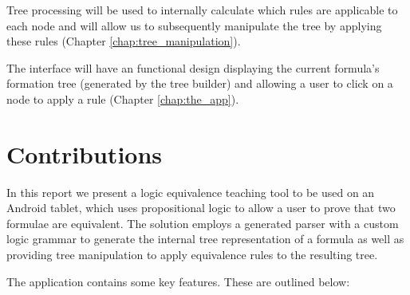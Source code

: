 \documentclass{report}
\begin{document}
Tree processing will be used to internally calculate which rules are applicable to each node and will allow us to subsequently manipulate the tree by applying these rules (Chapter \ref{chap:tree_manipulation}).

The interface will have an functional design displaying the current formula's formation tree (generated by the tree builder) and allowing a user to click on a node to apply a rule (Chapter \ref{chap:the_app}).

\section{Contributions}
\label{sec:objectives}

In this report we present a logic equivalence teaching tool to be used on an Android tablet, which uses propositional logic to allow a user to prove that two formulae are equivalent. The solution employs a generated parser with a custom logic grammar to generate the internal tree representation of a formula as well as providing tree manipulation to apply equivalence rules to the resulting tree. 

The application contains some key features. These are outlined below:
\end{document}

